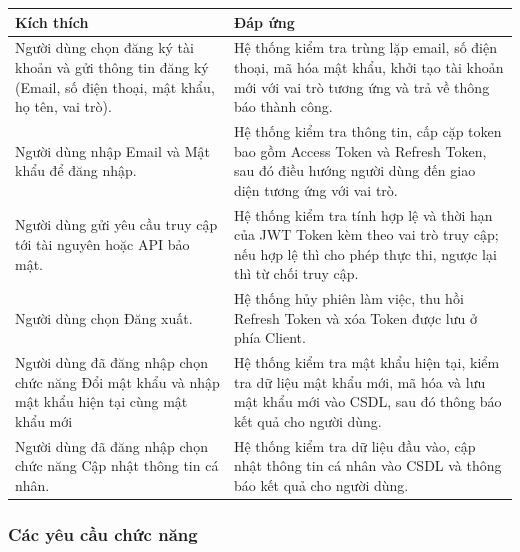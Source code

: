 \noindent
\begin{tabularx}{\textwidth}{|L{6.0cm}|X|}
    \hline
    \textbf{Kích thích} & \textbf{Đáp ứng} \\ \hline
    Người dùng chọn đăng ký tài khoản và gửi thông tin đăng ký (Email, số điện thoại, mật khẩu, họ tên, vai trò). & Hệ thống kiểm tra trùng lặp email, số điện thoại, mã hóa mật khẩu, khởi tạo tài khoản mới với vai trò tương ứng và trả về thông báo thành công. \\ \hline
    Người dùng nhập Email và Mật khẩu để đăng nhập. & Hệ thống kiểm tra thông tin, cấp cặp token bao gồm Access Token và Refresh Token, sau đó điều hướng người dùng đến giao diện tương ứng với vai trò. \\ \hline
    Người dùng gửi yêu cầu truy cập tới tài nguyên hoặc API bảo mật. & Hệ thống kiểm tra tính hợp lệ và thời hạn của JWT Token kèm theo vai trò truy cập; nếu hợp lệ thì cho phép thực thi, ngược lại thì từ chối truy cập. \\ \hline
    Người dùng chọn Đăng xuất. & Hệ thống hủy phiên làm việc, thu hồi Refresh Token và xóa Token được lưu ở phía Client. \\ \hline
    Người dùng đã đăng nhập chọn chức năng Đổi mật khẩu và nhập mật khẩu hiện tại cùng mật khẩu mới & Hệ thống kiểm tra mật khẩu hiện tại, kiểm tra dữ liệu mật khẩu mới, mã hóa và lưu mật khẩu mới vào CSDL, sau đó thông báo kết quả cho người dùng. \\ \hline
    Người dùng đã đăng nhập chọn chức năng Cập nhật thông tin cá nhân. & Hệ thống kiểm tra dữ liệu đầu vào, cập nhật thông tin cá nhân vào CSDL và thông báo kết quả cho người dùng. \\ \hline
\end{tabularx}

\subsubsection{Các yêu cầu chức năng}

